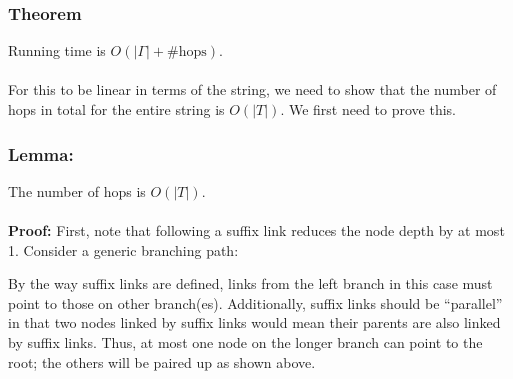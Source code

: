 \documentclass[10pt]{article}
\begin{document}
\subsubsection*{Theorem}
Running time is $O(|\Gamma| + \text{\# hops})$.\\\\
For this to be linear in terms of the string, we need to show that the number of hops in total for the entire string is $O(|T|)$.  We first need to prove this.

\subsubsection*{Lemma:}
The number of hops is $O(|T|)$.\\\\
\textbf{Proof:}
First, note that following a suffix link reduces the node depth by at most 1.  Consider a generic branching path:
\begin{center}
\end{center}
By the way suffix links are defined, links from the left branch in this case must point to those on other branch(es).  Additionally, suffix links should be ``parallel'' in that two nodes linked by suffix links would mean their parents are also linked by suffix links.  Thus, at most one node on the longer branch can point to the root; the others will be paired up as shown above.\\\\
\end{document}
